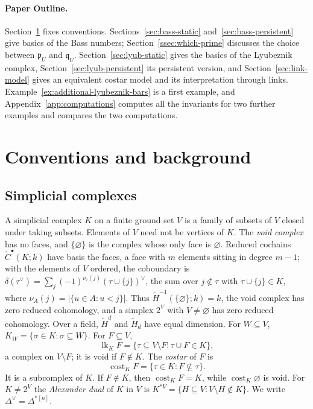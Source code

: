 \documentclass[11pt]{article}
\theoremstyle{plain}
\theoremstyle{definition}
\newcommand{\kk}{k}
\newcommand{\pp}{\mathfrak{p}}
\newcommand{\link}{\operatorname{lk}}
\newcommand{\cost}{\operatorname{cost}}
\newcommand{\rH}{\widetilde{H}}
\newcommand{\rC}{\widetilde{C}}
\begin{document}
\paragraph{Paper Outline.} Section~\ref{sec:background} fixes conventions. Sections~\ref{sec:bass-static}
and~\ref{sec:bass-persistent} give basics of the Bass numbers; Section~\ref{ssec:which-prime} discusses the choice between
$\pp_U$ and $\mathfrak q_U$. Section~\ref{sec:lyub-static} gives the basics of the Lyubeznik complex,
Section~\ref{sec:lyub-persistent} its persistent version, and Section~\ref{sec:link-model} gives an equivalent
costar model and its interpretation through links. Example~\ref{ex:additional-lyubeznik-bars} is a first example, and
Appendix~\ref{app:computations} computes all the invariants for two further examples and
compares the  two computations.


\section{Conventions and background}\label{sec:background}

\subsection{Simplicial complexes}

A simplicial complex $K$ on a finite ground set $V$ is a family of subsets of $V$ closed under taking
subsets. Elements of $V$ need not be vertices of $K$. The \emph{void complex} has no faces, and
$\{\varnothing\}$ is the complex whose only face is $\varnothing$. Reduced cochains $\rC^\bullet(K;\kk)$
have basis the faces, a face with $m$ elements sitting in degree $m-1$; with the elements of $V$ ordered,
the coboundary is $\delta(\tau^\vee)=\sum_{j}(-1)^{\nu_\tau(j)}(\tau\cup\{j\})^\vee$, the sum over
$j\notin\tau$ with $\tau\cup\{j\}\in K$, where $\nu_A(j)=|\{u\in A:u<j\}|$. Thus
$\rH^{-1}(\{\varnothing\};\kk)=\kk$, the void complex has zero reduced cohomology, and a simplex $2^V$
with $V\neq\varnothing$ has zero reduced cohomology. Over a field, $\rH^d$ and $\rH_d$ have equal
dimension. For $W\subseteq V$, $K_W=\{\sigma\in K:\sigma\subseteq W\}$. For $F\subseteq V$,
\[
\link_K F=\{\tau\subseteq V\setminus F:\tau\cup F\in K\},
\]
a complex on $V\setminus F$; it is void if $F\notin K$. The \emph{costar} of $F$ is
\[
\cost_K F=\{\tau\in K:F\not\subseteq\tau\}.
\]
It is a subcomplex of $K$. If $F\notin K$, then
$\cost_K F=K$, while $\cost_K\varnothing$ is void.
For $K\neq 2^V$ the \emph{Alexander dual} of $K$ in
$V$ is $K^{*V}=\{H\subseteq V:V\setminus H\notin K\}$. We write $\Delta^\vee=\Delta^{*[n]}$.
\end{document}
